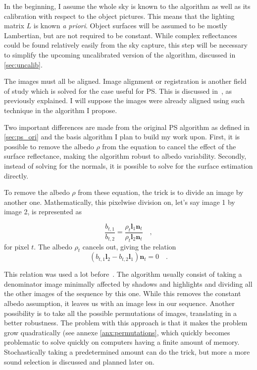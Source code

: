 \documentclass{report}
\begin{document}
In the beginning, I assume the whole sky is known to the algorithm as well as its calibration with respect to the object pictures. This means that the lighting matrix $L$ is known \emph{a priori}. Object surfaces will be assumed to be mostly Lambertian, but are not required to be constant. While complex reflectances could be found relatively easily from the sky capture, this step will be necessary to simplify the upcoming uncalibrated version of the algorithm, discussed in \ref{sec:uncalib}.

The images must all be aligned. Image alignment or registration is another field of study which is solved for the case useful for PS. This is discussed in~\cite{ackermann-cvpr-12}, as previously explained. I will suppose the images were already aligned using such technique in the algorithm I propose.

Two important differences are made from the original PS algorithm as defined in \ref{sec:ps_ori} and the basis algorithm I plan to build my work upon. First, it is possible to remove the albedo $\rho$ from the equation to cancel the effect of the surface reflectance, making the algorithm robust to albedo variability. Secondly, instead of solving for the normals, it is possible to solve for the surface estimation directly. 

To remove the albedo $\rho$ from these equation, the trick is to divide an image by another one. Mathematically, this pixelwise division on, let's say image 1 by image 2, is represented as

\begin{equation}
\frac{b_{t,1}}{b_{t,2}} = \frac{\rho_t \mathbf{l}_1 \mathbf{n}_t}{\rho_t \mathbf{l}_2 \mathbf{n}_t} \quad,
\end{equation}
for pixel $t$. The albedo $\rho_t$ cancels out, giving the relation
\begin{equation}
\label{eq:ratio_images}
\left( b_{t,1} \mathbf{l}_2 - b_{t,2} \mathbf{l}_1 \right) \mathbf{n}_t = 0  \quad.
\end{equation}

This relation was used a lot before~\cite{yu-iccp-13,wu-pami-06}. The algorithm usually consist of taking a denominator image minimally affected by shadows and highlights and dividing all the other images of the sequence by this one. While this removes the constant albedo assumption, it leaves us with an image less in our sequence. Another possibility is to take all the possible permutations of images, translating in a better robustness. The problem with this approach is that it makes the problem grow quadratically (see annexe \ref{anx:permutations}, which quickly becomes problematic to solve quickly on computers having a finite amount of memory. Stochastically taking a predetermined amount can do the trick, but more a more sound selection is discussed and planned later on.
 
\end{document}
